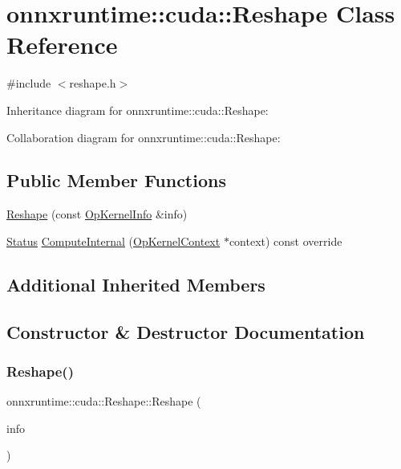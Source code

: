 \hypertarget{classonnxruntime_1_1cuda_1_1Reshape}{}\section{onnxruntime\+:\+:cuda\+:\+:Reshape Class Reference}
\label{classonnxruntime_1_1cuda_1_1Reshape}


{\ttfamily \#include $<$reshape.\+h$>$}



Inheritance diagram for onnxruntime\+:\+:cuda\+:\+:Reshape\+:


Collaboration diagram for onnxruntime\+:\+:cuda\+:\+:Reshape\+:
\subsection*{Public Member Functions}
\begin{DoxyCompactItemize}
\item 
\mbox{\hyperlink{classonnxruntime_1_1cuda_1_1Reshape_a92fdfd527b979fedc5595b2be4c0d64b}{Reshape}} (const \mbox{\hyperlink{classonnxruntime_1_1OpKernelInfo}{Op\+Kernel\+Info}} \&info)
\item 
\mbox{\hyperlink{classonnxruntime_1_1common_1_1Status}{Status}} \mbox{\hyperlink{classonnxruntime_1_1cuda_1_1Reshape_a110bf34bdeed233d0e614d168ff438c3}{Compute\+Internal}} (\mbox{\hyperlink{classonnxruntime_1_1OpKernelContext}{Op\+Kernel\+Context}} $\ast$context) const override
\end{DoxyCompactItemize}
\subsection*{Additional Inherited Members}


\subsection{Constructor \& Destructor Documentation}
\mbox{\label{classonnxruntime_1_1cuda_1_1Reshape_a92fdfd527b979fedc5595b2be4c0d64b}} 
\subsubsection{\texorpdfstring{Reshape()}{Reshape()}}
{\footnotesize\ttfamily onnxruntime\+::cuda\+::\+Reshape\+::\+Reshape (\begin{DoxyParamCaption}\item[{const \mbox{\hyperlink{classonnxruntime_1_1OpKernelInfo}{Op\+Kernel\+Info}} \&}]{info }\end{DoxyParamCaption})\hspace{0.3cm}{\ttfamily [inline]}}



